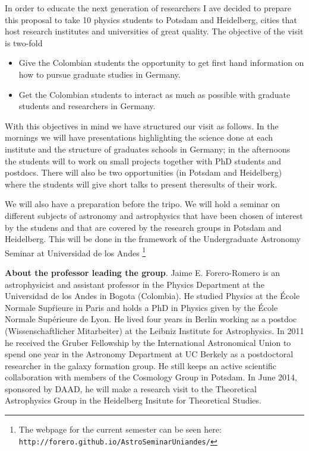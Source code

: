 \documentclass[12pt]{article}
\begin{document}
In order to educate the next generation of researchers I ave decided
to prepare this proposal to take 10 physics students to Potsdam and
Heidelberg, cities that host research institutes and universities of
great quality. The objective of the visit is two-fold

\begin{itemize}
\item
 Give the Colombian students the opportunity to get first hand
 information on how to pursue graduate studies in Germany. 
\item 
  Get the Colombian students to  interact as much as possible with
  graduate students and researchers in Germany.  
\end{itemize}


With this objectives in mind we have structured our visit as
follows. In the mornings we will have presentations highlighting
the science done at each institute and the structure of graduates
schools in Germany; in the afternoons the students will to work on small
projects together with PhD students and postdocs. There will also be
two opportunities (in Potsdam and Heidelberg) where the students will
give short talks to present theresults of their work.

We will also have a preparation before the tripo. We will hold a
seminar on different subjects of astronomy and astrophysics that have
been chosen of interest by the studens and that are covered by the
research groups in Potsdam and Heidelberg. This will be done in the
framework of the Undergraduate Astronomy Seminar at Universidad de los
Andes \footnote{The webpage for the current semester can be seen here:
\texttt{http://forero.github.io/AstroSeminarUniandes/}}


{\bf About the professor leading the group}. Jaime E. Forero-Romero
is an astrophysicist and assistant professor in the Physics Department
at the Universidad de los Andes in Bogota (Colombia). He studied
Physics at the \'Ecole Normale Sup\'rieure in Paris and holds a PhD in
Physics given by the \'Ecole Normale Supérieure de Lyon. He lived four
years in Berlin working as a postdoc (Wissenschaftlicher Mitarbeiter)
at the Leibniz Institute for Astrophysics. In 2011 he received the
Gruber Fellowship by the International Astronomical Union to spend one
year in the Astronomy Department at UC Berkely as a postdoctoral
researcher in the galaxy formation group. He still keeps an active
scientific collaboration with members of the Cosmology Group in
Potsdam. In June 2014, sponsored by DAAD, he will make a research
visit to the Theoretical Astrophysics Group in the Heidelberg
Insitute for Theoretical Studies. 
 
\end{document}

